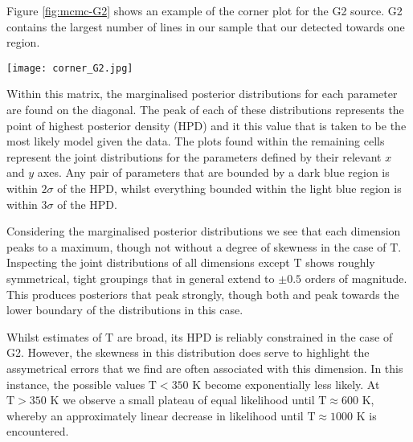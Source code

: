 \documentclass[twocolumn]{aastex631}
\begin{document}
Figure \ref{fig:mcmc-G2} shows an example of the corner plot for the G2 source. G2 contains the largest number of lines in our sample that our detected towards one region. 

\begin{figure*}
    \centering
    \texttt{[image: corner\_G2.jpg]}
    \caption{An example corner plot for the G2 source that shows the sampled distributions for each parameter, known as dimensions, in the model. Each dimension is shown on the $x$ axis; the distributions on the diagonal represents the posterior distributions for the relevant dimension e.g. the posterior on the top left is the $\mathrm{T}$ posterior. All other plots in the matrix show the joint distributions of parameters as per their $x$ and $y$ axes that contribute to the associated posterior. Tight constraints are observed in the joint distributions within all dimensions except $\mathrm{T}$ which exhibits broad behaviour along its domain and highlights the broad errors associated with this dimension.}
    \label{fig:mcmc-G2}
\end{figure*}

Within this matrix, the marginalised posterior distributions for each parameter are found on the diagonal. The peak of each of these distributions represents the point of highest posterior density (HPD) and it this value that is taken to be the most likely model given the data. The plots found within the remaining cells represent the joint distributions for the parameters defined by their relevant $x$ and $y$ axes. Any pair of parameters that are bounded by a dark blue region is within $2\sigma$ of the HPD, whilst everything bounded within the light blue region is within $3\sigma$ of the HPD.

Considering the marginalised posterior distributions we see that each dimension peaks to a maximum, though not without a degree of skewness in the case of $\mathrm{T}$. Inspecting the joint distributions of all dimensions except $\mathrm{T}$ shows roughly symmetrical, tight groupings that in general extend to $\pm 0.5$ orders of magnitude. This produces posteriors that peak strongly, though both  and  peak towards the lower boundary of the distributions in this case. 

Whilst estimates of $\mathrm{T}$ are broad, its HPD is reliably constrained in the case of G2. However, the skewness in this distribution does serve to highlight the assymetrical errors that we find are often associated with this dimension. In this instance, the possible values $\mathrm{T} < 350$ \si{\kelvin} become exponentially less likely. At $\mathrm{T} > 350$ \si{\kelvin} we observe a small plateau of equal likelihood until $\mathrm{T} \approx 600$ \si{\kelvin}, whereby an approximately linear decrease in likelihood until $\mathrm{T} \approx 1000$ \si{\kelvin} is encountered. 
\end{document}
